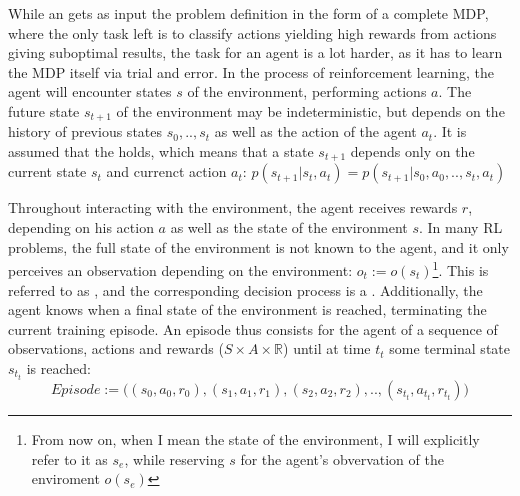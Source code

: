 While an  gets as input the problem definition in the form of a complete MDP, where the only task left is to classify actions yielding high rewards from actions giving suboptimal results, the task for an  agent is a lot harder, as it has to learn the MDP itself via trial and error. In the process of reinforcement learning, the agent will encounter states $s$ of the environment, performing actions $a$. The future state $s_{t+1}$ of the environment may be indeterministic, but depends on the history of previous states $s_0, .., s_t$ as well as the action of the agent $a_t$. It is assumed that the  holds, which means that a state  $s_{t+1}$ depends only on the current state $s_t$ and currenct action $a_t$: $p(s_{t+1}|s_t,a_t) = p(s_{t+1}|s_0,a_0,..,s_t,a_t)$

Throughout interacting with the environment, the agent receives rewards $r$, depending on his action $a$ as well as the state of the environment $s$. In many RL problems, the full state of the environment is not known to the agent, and it only perceives an observation depending on the environment: $o_t := o(s_t)$\footnote{From now on, when I mean the state of the environment, I will explicitly refer to it as $s_e$, while reserving $s$ for the agent's obvervation of the enviroment $o(s_e)$}. This is referred to as , and the corresponding decision process is a . Additionally, the agent knows when a final state of the environment is reached, terminating the current training episode. An episode thus consists for the agent of a sequence of observations, actions and rewards ($S \times A \times \mathds{R}$) until at time $t_t$ some terminal state $s_{t_t}$ is reached: $$Episode := \big((s_0, a_0, r_0), (s_1, a_1, r_1), (s_2,a_2,r_2), .., (s_{t_t}, a_{t_t}, r_{t_t})\big)$$

